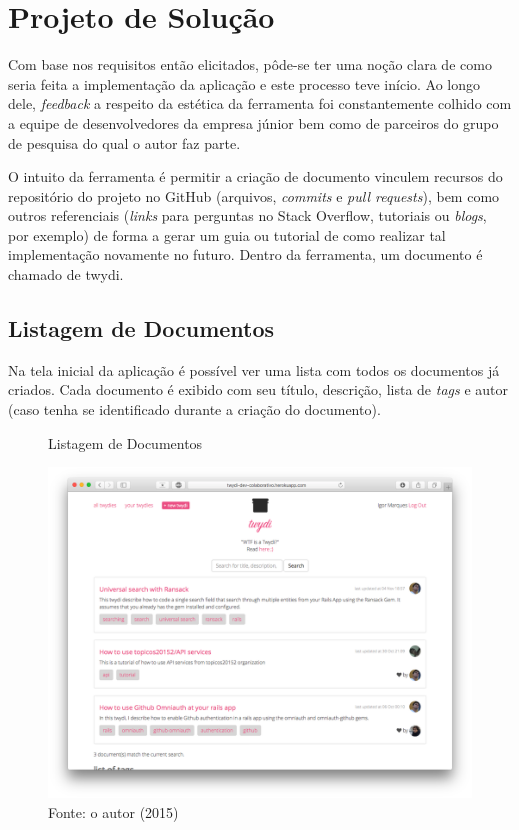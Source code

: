 \chapter{Projeto de Solução}

Com base nos requisitos então elicitados, pôde-se ter uma noção clara de como seria feita a implementação da aplicação e este processo teve início. Ao longo dele, \textit{feedback} a respeito da estética da ferramenta foi constantemente colhido com a equipe de desenvolvedores da empresa júnior bem como de parceiros do grupo de pesquisa do qual o autor faz parte.

O intuito da ferramenta é permitir a criação de documento vinculem recursos do repositório do projeto no GitHub (arquivos, \textit{commits} e \textit{pull requests}), bem como outros referenciais (\textit{links} para perguntas no Stack Overflow, tutoriais ou \textit{blogs}, por exemplo) de forma a gerar um guia ou tutorial de como realizar tal implementação novamente no futuro. Dentro da ferramenta, um documento é chamado de twydi.

\section{Listagem de Documentos}

Na tela inicial da aplicação é possível ver uma lista com todos os documentos já criados. Cada documento é exibido com seu título, descrição, lista de \textit{tags} e autor (caso tenha se identificado durante a criação do documento).

\begin{figure}[h]
	\centering
    \caption{Listagem de Documentos}
    \includegraphics[width=15cm]{Imagens/print-lista-1.png}
	\caption*{Fonte: o autor (2015)}
\end{figure}

